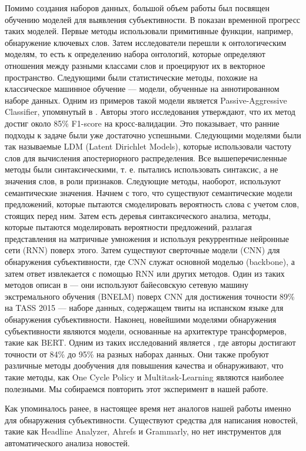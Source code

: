 \documentclass[conference]{IEEEtran}
\begin{document}
Помимо создания наборов данных, большой объем работы был посвящен обучению моделей для выявления субъективности. В \cite{survey} показан временной прогресс таких моделей. Первые методы использовали примитивные функции, например, обнаружение ключевых слов. Затем исследователи перешли к онтологическим моделям, то есть к определению набора онтологий, которые определяют отношения между разными классами слов и проецируют их в векторное пространство. Следующими были статистические методы, похожие на классическое машинное обучение — модели, обученные на аннотированном наборе данных. Одним из примеров такой модели является Passive-Aggressive Classifier, упомянутый в \cite{fact-opinion-classifier}. Авторы этого исследования утверждают, что их метод достиг около 85\% F1-score на кросс-валидации. Это показывает, что ранние подходы к задаче были уже достаточно успешными. Следующими моделями были так называемые LDM (Latent Dirichlet Models), которые использовали частоту слов для вычисления апостериорного распределения. Все вышеперечисленные методы были синтаксическими, т. е. пытались использовать синтаксис, а не значения слов, в роли признаков. Следующие методы, наоборот, используют семантические значения. Начнем с того, что существуют семантические модели предложений, которые пытаются смоделировать вероятность слова с учетом слов, стоящих перед ним. Затем есть деревья синтаксического анализа, методы, которые пытаются моделировать вероятности предложений, разлагая представления на матричные умножения и используя рекуррентные нейронные сети (RNN) поверх этого. Затем существуют сверточные модели (CNN) для обнаружения субъективности, где CNN служат основной моделью (backbone), а затем ответ извлекается с помощью RNN или других методов. Один из таких методов описан в \cite{bnelm} --- они используют байесовскую сетевую машину экстремального обучения (BNELM) поверх CNN для достижения точности 89\% на TASS 2015 --- наборе данных, содержащем твиты на испанском языке для обнаружения субъективности. Наконец, новейшими моделями обнаружения субъективности являются модели, основанные на архитектуре трансформеров, такие как BERT. Одним из таких исследований является \cite{bert-finetune}, где авторы достигают точности от 84\% до 95\% на разных наборах данных. Они также пробуют различные методы дообучения для повышения качества и обнаруживают, что такие методы, как One Cycle Policy и Multitask-Learning являются наиболее полезными. Мы собираемся повторить этот эксперимент в нашей работе.

Как упоминалось ранее, в настоящее время нет аналогов нашей работы именно для обнаружения субъективности. Существуют средства для написания новостей, такие как Headline Analyzer, Ahrefs и Grammarly, но нет инструментов для автоматического анализа новостей.
\end{document}
